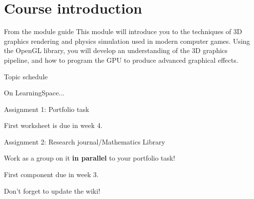 \part{Course introduction}
\frame{\partpage}

\begin{frame}{From the module guide}
This module will introduce you to the techniques of 3D graphics rendering and physics simulation used in modern computer games. Using the OpenGL library, you will develop an understanding of the 3D graphics pipeline, and how to program the GPU to produce advanced graphical effects.
\end{frame}

\begin{frame}{Topic schedule}
	\begin{center}
		On LearningSpace...
	\end{center}
\end{frame}

\begin{frame}{Assignment 1: Portfolio task}
	\begin{center}
		First worksheet is due in week 4.
	\end{center}
\end{frame}

\begin{frame}{Assignment 2: Research journal/Mathematics Library}
	\begin{center}
		Work as a group on it \textbf{in parallel} to your portfolio task!
		
		First component due in week 3.
		
		\pause Don't forget to update the wiki!
	\end{center}
\end{frame}
